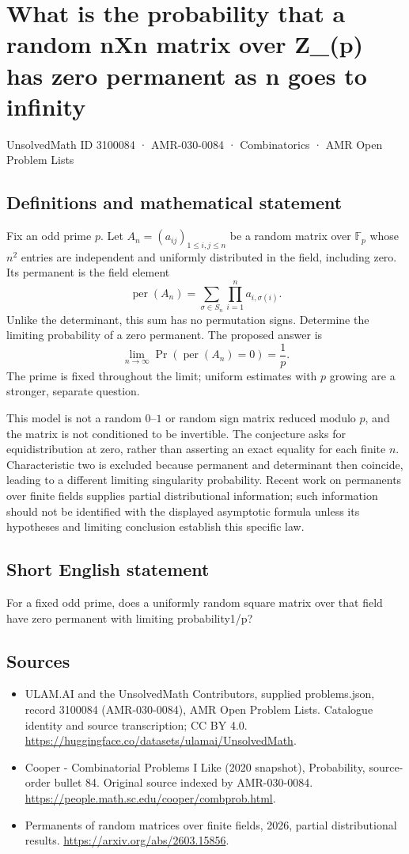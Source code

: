 \documentclass[11pt,a4paper]{article}
\begin{document}
\section*{What is the probability that a random nXn matrix over Z\_(p) has zero permanent as n goes to infinity}\label{3100084}
{\small UnsolvedMath ID 3100084 · AMR-030-0084 · Combinatorics · AMR Open Problem Lists}
\subsection{Definitions and mathematical statement}
Fix an odd prime $p$. Let $A_n=(a_{ij})_{1\le i,j\le n}$ be a
random matrix over $\mathbb F_p$ whose $n^2$ entries are independent
and uniformly distributed in the field, including zero.
Its permanent is the field element
\[
           \operatorname{per}(A_n)
               =\sum_{\sigma\in S_n}\prod_{i=1}^n a_{i,\sigma(i)}.
\]
Unlike the determinant, this sum has no permutation signs.
Determine the limiting probability of a zero permanent.
The proposed answer is
\[
             \lim_{n\to\infty}
                    \Pr(\operatorname{per}(A_n)=0)=\frac1p.
\]
The prime is fixed throughout the limit; uniform estimates with
$p$ growing are a stronger, separate question.

This model is not a random $0$--$1$ or random sign matrix reduced
modulo $p$, and the matrix is not conditioned to be invertible.
The conjecture asks for equidistribution at zero, rather than
asserting an exact equality for each finite $n$. Characteristic
two is excluded because permanent and determinant then coincide,
leading to a different limiting singularity probability.
Recent work on permanents over finite fields supplies partial
distributional information; such information should not be
identified with the displayed asymptotic formula unless its
hypotheses and limiting conclusion establish this specific law.
\subsection{Short English statement}
For a fixed odd prime, does a uniformly random square matrix over that field have zero permanent with limiting probability1/p?
\subsection{Sources}
\begin{itemize}
\item[S1] ULAM.AI and the UnsolvedMath Contributors, supplied problems.json, record 3100084 (AMR-030-0084), AMR Open Problem Lists. Catalogue identity and source transcription; CC BY 4.0.
\url{https://huggingface.co/datasets/ulamai/UnsolvedMath}.
\item[S2] Cooper - Combinatorial Problems I Like (2020 snapshot), Probability, source-order bullet 84. Original source indexed by AMR-030-0084.
\url{https://people.math.sc.edu/cooper/combprob.html}.
\item[S3] Permanents of random matrices over finite fields, 2026, partial distributional results.
\url{https://arxiv.org/abs/2603.15856}.
\end{itemize}
\end{document}
